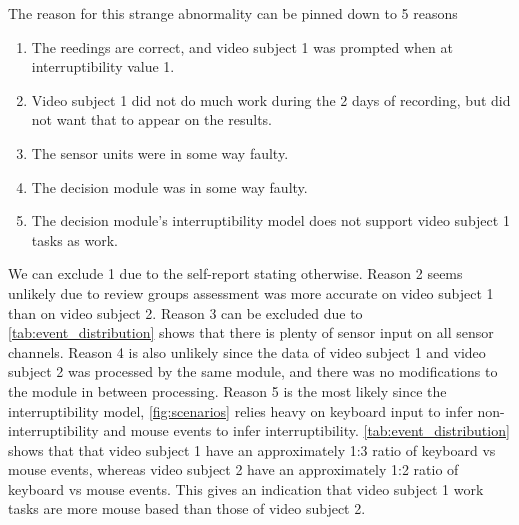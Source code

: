 \documentclass{sigchi}
\begin{document}
The reason for this strange abnormality can be pinned down to 5 reasons
\begin{enumerate}
  \item The reedings are correct, and video subject 1 was prompted when at interruptibility value 1.
  \item Video subject 1 did not do much work during the 2 days of recording, but did not want that to appear on the results.
  \item The sensor units were in some way faulty.
  \item The decision module was in some way faulty.
  \item The decision module's interruptibility model does not support video subject 1 tasks as work.
\end{enumerate}
We can exclude 1 due to the self-report stating otherwise.
Reason 2 seems unlikely due to review groups assessment was more accurate on video subject 1 than on video subject 2.
Reason 3 can be excluded due to \autoref{tab:event_distribution} shows that there is plenty of sensor input on all sensor channels.
Reason 4 is also unlikely since the data of video subject 1 and video subject 2 was processed by the same module, and there was no modifications to the module in between processing.
Reason 5 is the most likely since the interruptibility model, \autoref{fig:scenarios} relies heavy on keyboard input to infer non-interruptibility and mouse events to infer interruptibility. \autoref{tab:event_distribution} shows that that video subject 1 have an approximately 1:3 ratio of keyboard vs mouse events, whereas video subject 2 have an approximately 1:2 ratio of keyboard vs mouse events.
This gives an indication that video subject 1 work tasks are more mouse based than those of video subject 2.
\end{document}
